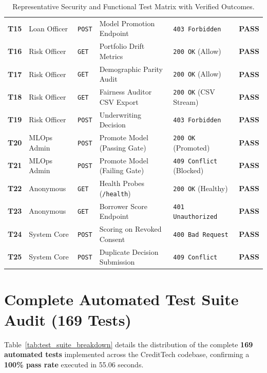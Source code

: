 \begin{table}[H]
\begin{tabularx}{\textwidth}{l p{2.2cm} p{1.6cm} p{3.2cm} p{2.4cm} c}
  \textbf{T15} & Loan Officer & \texttt{POST} & Model Promotion Endpoint & \texttt{403 Forbidden} & \textbf{PASS} \\
  \addlinespace
  \textbf{T16} & Risk Officer & \texttt{GET} & Portfolio Drift Metrics & \texttt{200 OK} (Allow) & \textbf{PASS} \\
  \textbf{T17} & Risk Officer & \texttt{GET} & Demographic Parity Audit & \texttt{200 OK} (Allow) & \textbf{PASS} \\
  \textbf{T18} & Risk Officer & \texttt{GET} & Fairness Auditor CSV Export & \texttt{200 OK} (CSV Stream) & \textbf{PASS} \\
  \textbf{T19} & Risk Officer & \texttt{POST} & Underwriting Decision & \texttt{403 Forbidden} & \textbf{PASS} \\
  \addlinespace
  \textbf{T20} & MLOps Admin & \texttt{POST} & Promote Model (Passing Gate) & \texttt{200 OK} (Promoted) & \textbf{PASS} \\
  \textbf{T21} & MLOps Admin & \texttt{POST} & Promote Model (Failing Gate) & \texttt{409 Conflict} (Blocked)& \textbf{PASS} \\
  \textbf{T22} & Anonymous & \texttt{GET} & Health Probes (\texttt{/health}) & \texttt{200 OK} (Healthy) & \textbf{PASS} \\
  \textbf{T23} & Anonymous & \texttt{GET} & Borrower Score Endpoint & \texttt{401 Unauthorized} & \textbf{PASS} \\
  \textbf{T24} & System Core & \texttt{POST} & Scoring on Revoked Consent & \texttt{400 Bad Request} & \textbf{PASS} \\
  \textbf{T25} & System Core & \texttt{POST} & Duplicate Decision Submission & \texttt{409 Conflict} & \textbf{PASS} \\
  \bottomrule
\end{tabularx}
\caption{Representative Security and Functional Test Matrix with Verified Outcomes.}
\label{tab:test_cases_matrix}
\end{table}

\section{Complete Automated Test Suite Audit (169 Tests)}
Table~\ref{tab:test_suite_breakdown} details the distribution of the complete \textbf{169 automated tests} implemented across the CreditTech codebase, confirming a \textbf{100\% pass rate} executed in 55.06 seconds.

